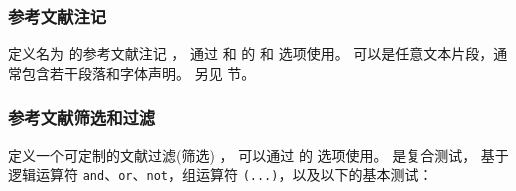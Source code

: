 \subsubsection{参考文献注记}%
\label{use:bib:nts}

\begin{ltxsyntax}



定义名为  的参考文献注记 ，
通过  和  的  和  选项使用。
 可以是任意文本片段，通常包含若干段落和字体声明。
另见  节。

\end{ltxsyntax}

\subsubsection{参考文献筛选和过滤} %
\label{use:bib:flt}

\begin{ltxsyntax}



定义一个可定制的文献过滤(筛选) ，
可以通过  的  选项使用。
 是复合测试，
基于逻辑运算符 \texttt{and}、\texttt{or}、\texttt{not}，组运算符 \texttt{(...)}，以及以下的基本测试：

\end{ltxsyntax}


